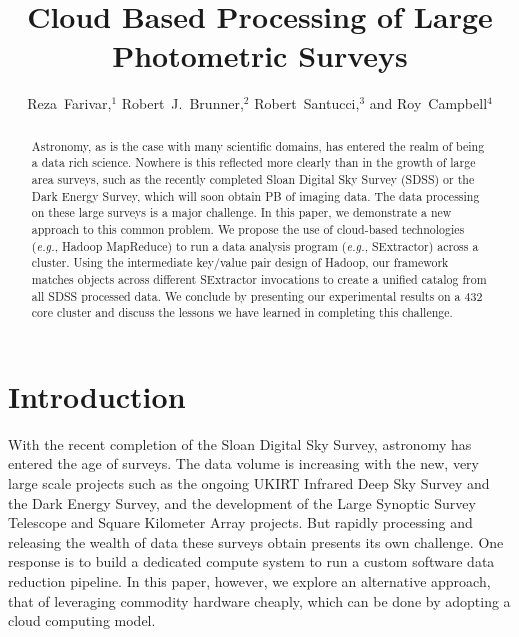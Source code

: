
\resetcounters




\title{Cloud Based Processing of Large Photometric Surveys}
\author{Reza~Farivar,$^1$ Robert~J.~Brunner,$^2$ Robert~Santucci,$^3$ and Roy~Campbell$^4$
}


\begin{abstract}
Astronomy, as is the case with many scientific domains, has entered the realm of being a data rich science. Nowhere is this reflected more clearly than in the growth of large area surveys, such as the recently completed Sloan Digital Sky Survey (SDSS) or the Dark Energy Survey, which will soon obtain PB of imaging data. The data processing on these large surveys is a major challenge.
In this paper, we demonstrate a new approach to this common problem. We propose the use of cloud-based technologies (\textit{e.g.}, Hadoop MapReduce) to run a data analysis program (\textit{e.g.}, SExtractor) across a cluster.
Using the intermediate key/value pair design of Hadoop, our framework matches objects across different SExtractor invocations to create a unified catalog from all SDSS processed data. We conclude by presenting our experimental results on a 432 core cluster and discuss the lessons we have learned in completing this challenge.
\end{abstract}

\section{Introduction}
With the recent completion of the Sloan Digital Sky Survey, astronomy has entered the age of surveys. The data volume is increasing with the new, very large scale projects such as the ongoing UKIRT Infrared Deep Sky Survey and the Dark Energy Survey, and the development of the Large Synoptic Survey Telescope and Square Kilometer Array projects. But rapidly processing and releasing the wealth of data these surveys obtain presents its own challenge. One response is to build a dedicated compute system to run a custom software data reduction pipeline. In this paper, however, we explore an alternative approach, that of leveraging commodity hardware cheaply, which can be done by adopting a cloud computing model. 

